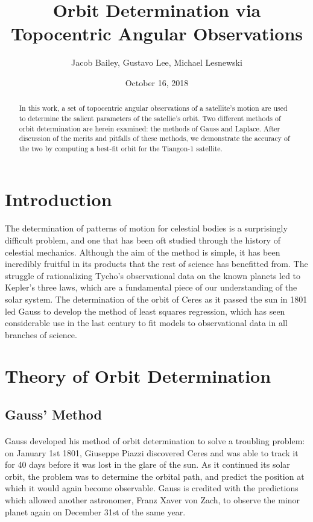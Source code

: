 \documentclass[11pt,twoside,letterpaper]{article}
\begin{document}
\title{Orbit Determination via Topocentric Angular Observations}
\author{Jacob Bailey, Gustavo Lee, Michael Lesnewski}
\date{October 16, 2018}
\maketitle

  \begin{abstract}
    In this work, a set of topocentric angular observations of a
    satellite's motion are used to determine the salient parameters of
    the satellie's orbit. Two different methods of orbit determination
    are herein examined: the methods of Gauss and Laplace. After
    discussion of the merits and pitfalls of these methods, we
    demonstrate the accuracy of the two by computing a best-fit orbit
    for the Tiangon-1 satellite.
  \end{abstract}

  \section {Introduction}
  \paragraph{}
  The determination of patterns of motion for celestial bodies is a
  surprisingly difficult problem, and one that has been oft studied
  through the history of celestial mechanics. Although the aim of the
  method is simple, it has been incredibly fruitful in its products
  that the rest of science has benefitted from. The struggle of
  rationalizing Tycho's observational data on the known planets led to
  Kepler's three laws, which are a fundamental piece of our
  understanding of the solar system. The determination of the orbit of
  Ceres as it passed the sun in 1801 led Gauss to develop the method
  of least squares regression, which has seen considerable use in the
  last century to fit models to observational data in all branches of
  science.

  
  \section{Theory of Orbit Determination}
  
  \subsection {Gauss' Method}
    
  \paragraph{}
  Gauss developed his method of orbit determination to solve a
  troubling problem: on January 1st 1801, Giuseppe Piazzi discovered
  Ceres and was able to track it for 40 days before it was lost in the
  glare of the sun. As it continued its solar orbit, the problem was
  to determine the orbital path, and predict the position at which it
  would again become observable. Gauss is credited with the
  predictions which allowed another astronomer, Franz Xaver von Zach,
  to observe the minor planet again on December 31st of the same year.
\end{document}
